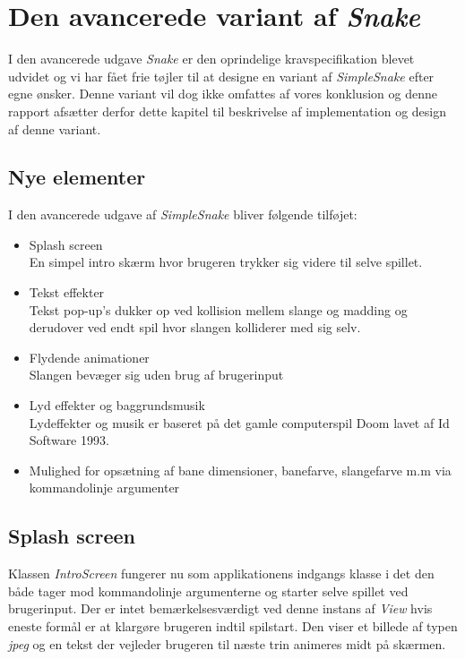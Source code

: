 \documentclass[]{article}
\begin{document}
\section{Den avancerede variant af \textit{Snake}}

I den avancerede udgave \textit{Snake} er den oprindelige kravspecifikation blevet udvidet og vi har fået frie tøjler til at designe en variant af \textit{SimpleSnake} efter egne ønsker. Denne variant vil dog ikke omfattes af vores konklusion og denne rapport afsætter derfor dette kapitel til beskrivelse af implementation og design af denne variant.  

\subsection{Nye elementer}
I den avancerede udgave af \textit{SimpleSnake} bliver følgende tilføjet:
\begin{itemize}
	\item Splash screen \\
	En simpel intro skærm hvor brugeren trykker sig videre til selve spillet.
	\item Tekst effekter \\
	Tekst pop-up's dukker op ved kollision mellem slange og madding og derudover ved endt spil hvor slangen kolliderer med sig selv.
	\item Flydende animationer \\
	Slangen bevæger sig uden brug af brugerinput
	\item Lyd effekter og baggrundsmusik \\
	Lydeffekter og musik er baseret på det gamle computerspil Doom lavet af Id Software 1993.
	\item Mulighed for opsætning af bane dimensioner, banefarve, slangefarve m.m via kommandolinje argumenter
	
\end{itemize}
	
	\subsection{Splash screen}
	
	Klassen \textit{IntroScreen} fungerer nu som applikationens indgangs klasse i det den både tager mod kommandolinje argumenterne og starter selve spillet ved brugerinput. Der er intet bemærkelsesværdigt ved denne instans af \textit{View} hvis eneste formål er at klargøre brugeren indtil spilstart. Den viser et billede af typen \textit{jpeg} og en tekst der vejleder brugeren til næste trin animeres midt på skærmen.
	
\end{document}
